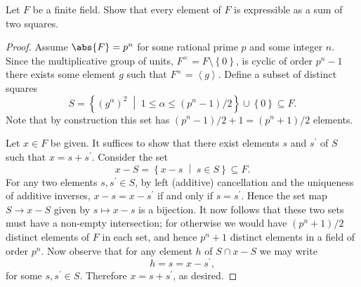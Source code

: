 \documentclass[10pt]{amsart}
\begin{document}
\begin{thm}
  Let $F$ be a finite field.
  Show that every element of $F$ is expressible as a sum of two squares.
  \begin{proof}
    Assume $\abs{F} = p^n$ for some rational prime $p$ and some integer $n$.
    Since the multiplicative group of units, $F^\times = F \setminus \left\{0\right\}$, is cyclic of order $p^n-1$ there exists some element $g$ such that $F^\times = \left<g\right>.$
    Define a subset of distinct squares $$S = \left\{(g^\alpha)^2 \;\middle\vert\; 1 \leq \alpha \leq (p^n-1)/2 \right\} \cup \left\{0\right\} \subseteq F.$$
    Note that by construction this set has $(p^n-1)/2 + 1 = (p^n + 1)/2$ elements.
    
    Let $x \in F$ be given.
    It suffices to show that there exist elements $s$ and $s^\prime$ of $S$ such that $x = s + s^\prime$.
    Consider the set
    $$x - S = \left\{x - s \;\middle\vert\; s \in S\right\} \subseteq F.$$
    For any two elements $s, s^\prime \in S$, by left (additive) cancellation and the uniqueness of additive inverses, $x - s = x - s^\prime$ if and only if $s = s^\prime$.
    Hence the set map $S \rightarrow x - S$ given by $s \mapsto x - s$ is a bijection.
    It now follows that these two sets must have a non-empty intersection; for otherwise we would have $(p^n + 1) / 2$ distinct elements of $F$ in each set, and hence $p^n + 1$ distinct elements in a field of order $p^n$.
    Now observe that for any element $h$ of $S \cap x - S$ we may write $$h = s = x - s^\prime,$$ for some $s,s^\prime \in S$. 
    Therefore $x = s + s^\prime$, as desired.
  \end{proof}
\end{thm}
\end{document}
